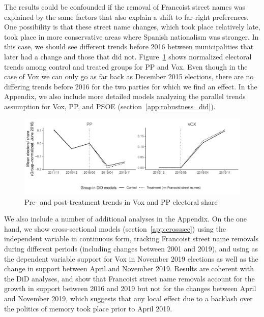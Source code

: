 \documentclass[12pt, notitlepage]{article}
\begin{document}
The results could be confounded if the removal of Francoist street names was explained by the same factors that also explain a shift to far-right preferences.
One possibility is that these street name changes, which took place relatively late, took place in more conservative areas where Spanish nationalism was stronger.
In this case, we should see different trends before 2016 between municipalities that later had a change and those that did not.
Figure~\ref{fig:par_trends_norm} shows normalized electoral trends among control and treated groups for PP and Vox.
Even though in the case of Vox we can only go as far back as December 2015 elections, there are no differing trends before 2016 for the two parties for which we find an effect.
In the Appendix, we also include more detailed models analyzing the parallel trends assumption for Vox, PP, and PSOE (section~\ref{app:robustness_did}).

\begin{figure}[htb!]
\centering

  \includegraphics[width = \textwidth]{img/par_trends_norm}

  \caption{Pre- and post-treatment trends in Vox and PP electoral share}\label{fig:par_trends_norm}

\end{figure}


We also include a number of additional analyses in the Appendix.
On the one hand, we show cross-sectional models (section~\ref{app:crosssec}) using the independent variable in continuous form, tracking Francoist street name removals during different periods (including changes between 2001 and 2019), and using as the dependent variable support for Vox in November 2019 elections as well as the change in support between April and November 2019.
Results are coherent with the DiD analyses, and show that Francoist street name removals account for the growth in support between 2016 and 2019 but not for the changes between April and November 2019, which suggests that any local effect due to a backlash over the politics of memory took place prior to April 2019.
\end{document}
